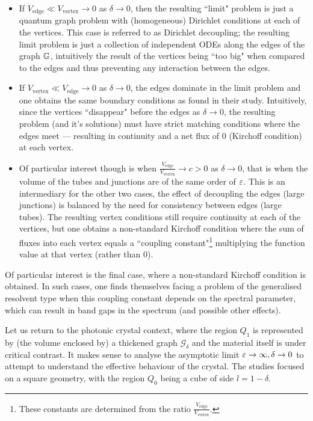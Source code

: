 \begin{itemize}
	\item If $V_{\mathrm{edge}}\ll V_{\mathrm{vertex}}\rightarrow0$ as $\delta\rightarrow0$, then the resulting ``limit" problem is just a quantum graph problem with (homogeneous) Dirichlet conditions at each of the vertices.
	This case is referred to as Dirichlet decoupling; the resulting limit problem is just a collection of independent ODEs along the edges of the graph $\mathbb{G}$, intuitively the result of the vertices being ``too big" when compared to the edges and thus preventing any interaction between the edges.
	\item If $V_{\mathrm{vertex}}\ll V_{\mathrm{edge}}\rightarrow0$ as $\delta\rightarrow0$, the edges dominate in the limit problem and one obtains the same boundary conditions as  found in their study.
	Intuitively, since the vertices ``disappear" before the edges as $\delta\rightarrow0$, the resulting problem (and it's solutions) must have strict matching conditions where the edges meet --- resulting in continuity and a net flux of 0 (Kirchoff condition) at each vertex.
	\item Of particular interest though is when $\frac{V_{\mathrm{edge}}}{V_{\mathrm{vertex}}}\rightarrow c>0$ as $\delta\rightarrow0$, that is when the volume of the tubes and junctions are of the same order of $\varepsilon$.
	This is an intermediary for the other two cases, the effect of decoupling the edges (large junctions) is balanced by the need for consistency between edges (large tubes).
	The resulting vertex conditions still require continuity at each of the vertices, but one obtains a non-standard Kirchoff condition where the sum of fluxes into each vertex equals a ``coupling constant"\footnote{These constants are determined from the ratio $\frac{V_{\mathrm{edge}}}{V_{\mathrm{vertex}}}$.} multiplying the function value at that vertex (rather than 0).
\end{itemize}
Of particular interest is the final case, where a non-standard Kirchoff condition is obtained.
In such cases, one finds themselves facing a problem of the generalised resolvent type when this coupling constant depends on the spectral parameter, which  can result in band gaps in the spectrum (and possible other effects).

Let us return to the photonic crystal context, where the region $Q_1$ is represented by (the volume enclosed by) a thickened graph $\mathcal{G}_\delta$ and the material itself is under critical contrast.
It makes sense to analyse the asymptotic limit $\varepsilon\rightarrow\infty, \delta\rightarrow0$ to attempt to understand the effective behaviour of the crystal.
The studies  focused on a square geometry, with the region $Q_0$ being a cube of side $l=1-\delta$.

